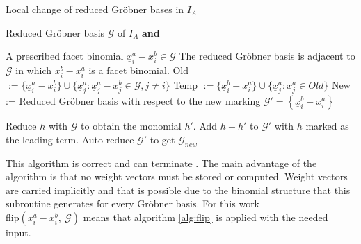 \begin{algorithm}
\caption{Local change of reduced Gröbner bases in $I_A$ \cite{tigers}}
\label{alg:flip}
\begin{algorithmic}[1]

\Input
Reduced Gröbner basis $ \mathcal{G} $ of $I_A$ \textbf{and}

    A prescribed facet binomial $ \underline{x}^{a}_{i} - x^{b}_{i} \in \mathcal{G} $
\Output The reduced Gröbner basis is adjacent to $\mathcal{G}$ in which $ \underline{x}^{b}_{i} - x^{a}_{i} $ is a facet binomial.
\State Old 
$:= \lbrace \underline{x}^{a}_{i} - x^{b}_{i} \rbrace \cup
 \lbrace \underline{x}^{a}_{j} : \underline{x}^{a}_{j} - x^{b}_{j} \in \mathcal{G},
 j \neq i \rbrace $ 
 \State Temp $:= \lbrace \underline{x}^{b}_{i} - x^{a}_{i} \rbrace \cup 
 \lbrace \underline{x}^{a}_{j} : x^{a}_{j} \in Old  \rbrace $
 \State New := Reduced Gröbner basis with respect to the new marking 
 \State $\mathcal{G}' = \left\lbrace \underline{x}^{b}_{i} - x^{a}_{i} \right\rbrace  $
 
 \State Reduce $h$ with $\mathcal{G}$ to obtain the monomial $h'$.
 \State Add $h-h'$ to $\mathcal{G}'$ with $h$ marked as the leading term.
 \EndFor
 \State Auto-reduce $\mathcal{G}'$ to get $\mathcal{G}_{new}$

\end{algorithmic}
\end{algorithm}

This algorithm is correct and can terminate \cite{tigers}.
The main advantage of the algorithm is that no weight vectors must be stored or computed.
Weight vectors are carried implicitly and that is possible due to the binomial structure that this subroutine generates for every Gröbner basis. For this work \\ flip$({x}^{a}_{i} - x^{b}_{i},~\mathcal{G})$ means that algorithm \ref{alg:flip} is applied with the needed input.

